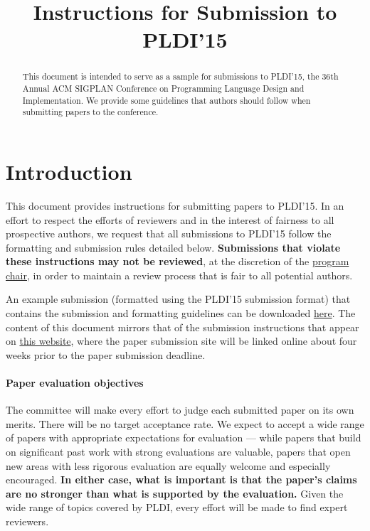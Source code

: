 \documentclass[pldi]{sigplanconf-pldi15}
\begin{document}
%
%

\title{Instructions for Submission to PLDI'15}

\maketitle
\begin{abstract}
  This document is intended to serve as a sample for submissions to PLDI'15,
  the 36th Annual ACM SIGPLAN Conference on Programming Language
  Design and Implementation.  We provide some guidelines
  that authors should follow when submitting papers to the conference.
\end{abstract}

\section{Introduction}

This document provides instructions for submitting papers to PLDI'15.
In an effort to respect the efforts of reviewers and in the interest
of fairness to all prospective authors, we request that all
submissions to PLDI'15 follow the formatting and submission rules
detailed below. \textbf{Submissions that violate these instructions
  may not be reviewed}, at the discretion of the
\href{mailto:emery@cs.umass.edu?subject=[PLDI'15]}{program
  chair}, in order to maintain a review process that is fair to all
potential authors.

An example submission (formatted using the PLDI'15 submission format)
that contains the submission and formatting guidelines can be
downloaded
\href{http://conf.researchr.org/getImage/pldi2015/orig/pldi15-template.pdf}{here}. The
content of this document mirrors that of the submission instructions
that appear on
\href{http://conf.researchr.org/track/pldi2015/pldi2015-papers#Submission-Instructions}{this website},
where the paper submission site will be linked online about four weeks
prior to the paper submission deadline.

\paragraph{Paper evaluation objectives}
The committee will make every effort to judge each submitted paper on
its own merits. There will be no target acceptance rate.  We expect to
accept a wide range of papers with appropriate expectations for
evaluation --- while papers that build on significant past work with
strong evaluations are valuable, papers that open new areas with less
rigorous evaluation are equally welcome and especially
encouraged. \textbf{In either case, what is important is that the
  paper's claims are no stronger than what is supported by the
  evaluation.}  Given the wide range of topics covered by PLDI, every
effort will be made to find expert reviewers.
\end{document}
